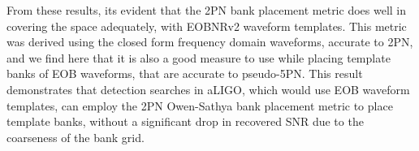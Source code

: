 \documentclass[aps,
prd,
amsmath,
amssymb,
twocolumn,
floatfix,
groupedaddress]{revtex4-1}
\begin{document}
From these results, its evident that the 2PN bank placement metric does well in covering the space adequately, with EOBNRv2 waveform templates. This metric was derived using the closed form frequency domain waveforms, accurate to 2PN, and we find here that it is also a good measure to use while placing template banks of EOB waveforms, that are accurate to pseudo-5PN. This result demonstrates that detection searches in aLIGO, which would use EOB waveform templates, can employ the 2PN Owen-Sathya bank placement metric to place template banks, without a significant drop in recovered SNR due to the coarseness of the bank grid.

%
\end{document}
